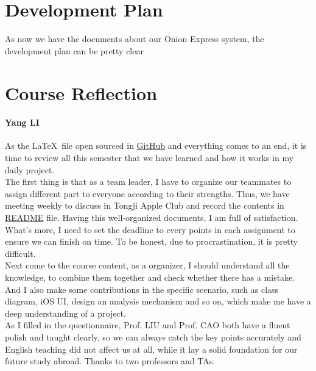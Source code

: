 \documentclass[12pt]{scrreprt}
\begin{document}
\chapter{Development Plan}
As now we have the documents about our Onion Express system, the development plan can be pretty clear

\chapter{Course Reflection}
\subsubsection{Yang LI}
As the \LaTeX\ file open sourced in \href{https://github.com/zjzsliyang/OnionExpress}{GitHub} and everything comes to an end, it is time to review all this semester that we have learned and how it works in my daily project.\\
The first thing is that as a team leader, I have to organize our teammates to assign different part to everyone according to their strengths. Thus, we have meeting weekly to discuss in Tongji Apple Club and record the contents in \href{https://github.com/zjzsliyang/OnionExpress/blob/master/README.md}{README} file. Having this well-organized documents, I am full of satisfaction. What's more, I need to set the deadline to every points in each assignment to ensure we can finish on time. To be honest, due to procrastination, it is pretty difficult.\\
Next come to the course content, as a organizer, I should understand all the knowledge, to combine them together and check whether there has a mistake. And I also make some contributions in the specific scenario, such as class diagram, iOS UI, design an analysis mechanism and so on, which make me have a deep understanding of a project.\\
As I filled in the questionnaire, Prof. LIU and Prof. CAO both have a fluent polish and taught clearly, so we can always catch the key points accurately and English teaching did not affect us at all, while it lay a solid foundation for our future study abroad. Thanks to two professors and TAs.
\end{document}
